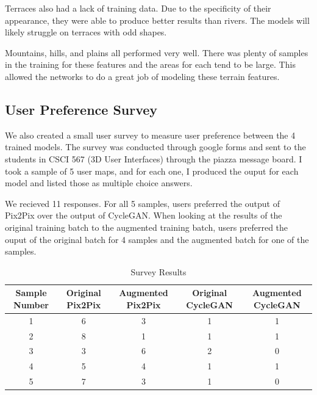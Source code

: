 \documentclass[twocolumn]{article}
\begin{document}
	Terraces also had a lack of training data. Due to the specificity of their appearance, they were able to produce better results than rivers. The models will likely struggle on terraces with odd shapes.

	Mountains, hills, and plains all performed very well. There was plenty of samples in the training for these features and the areas for each tend to be large. This allowed the networks to do a great job of modeling these terrain features.

	\subsection{User Preference Survey}
	
	We also created a small user survey to measure user preference between the 4 trained models. The survey was conducted through google forms and sent to the students in CSCI 567 (3D User Interfaces) through the piazza message board. I took a sample of 5 user maps, and for each one, I produced the ouput for each model and listed those as multiple choice answers.
	
	We recieved 11 responses. For all 5 samples, users preferred the output of Pix2Pix over the output of CycleGAN. When looking at the results of the original training batch to the augmented training batch, users preferred the ouput of the original batch for 4 samples and the augmented batch for one of the samples.

	\begin{table}[h]
		\begin{tabular}{c|c|c|c|c}
			Sample Number & Original Pix2Pix & Augmented Pix2Pix & Original CycleGAN & Augmented CycleGAN \\
			\hline
			1 & 6 & 3 & 1 & 1 \\
			2 & 8 & 1 & 1 & 1 \\
			3 & 3 & 6 & 2 & 0 \\
			4 & 5 & 4 & 1 & 1 \\
			5 & 7 & 3 & 1 & 0
		\end{tabular}
		
	\caption{Survey Results}
	\end{table}	
	
\end{document}
